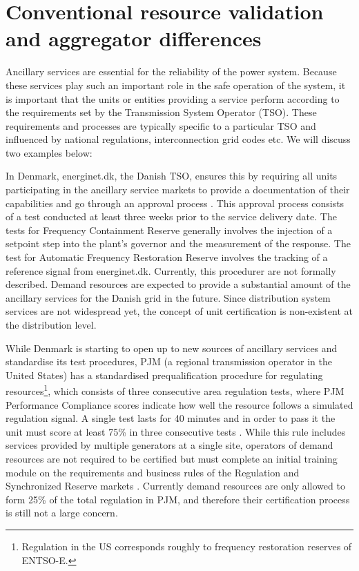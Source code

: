 \section{Conventional resource validation and aggregator differences}
Ancillary services are essential for the reliability of the power system. Because these services play such an important role in the safe operation of the system, it is important that the units or entities providing a service perform according to the requirements set by the Transmission System Operator (TSO). These requirements and processes are typically specific to a particular TSO and influenced by national regulations, interconnection grid codes etc. We will discuss two examples below:

In Denmark, energinet.dk, the Danish TSO, ensures this by requiring all units participating in the ancillary service markets to provide a documentation of their capabilities and go through an approval process \cite{energinettender}. This approval process consists of a test conducted at least three weeks prior to the service delivery date. The tests for Frequency Containment Reserve generally involves the injection of a setpoint step into the plant's governor and the measurement of the response. The test for Automatic Frequency Restoration Reserve involves the tracking of a reference signal from energinet.dk. Currently, this procedurer are not formally described.
Demand resources are expected to provide a substantial amount of the ancillary services for the Danish grid in the future. Since distribution system services are not widespread yet, the concept of unit certification is non-existent at the distribution level. 

While Denmark is starting to open up to new sources of ancillary services and standardise its test procedures, PJM (a regional transmission operator in the United States) has a standardised prequalification procedure for regulating resources\footnote{Regulation in the US corresponds roughly to frequency restoration reserves of ENTSO-E.}, which consists of three consecutive area regulation tests, where PJM Performance Compliance scores indicate how well the resource follows a simulated regulation signal. A single test lasts for 40 minutes and in order to pass it the unit must score at least 75\% in three consecutive tests \cite{pjm2015balance}. While this rule includes services provided by multiple generators at a single site, operators of demand resources are not required to be certified but must complete an initial training module on the requirements and business rules of the Regulation and Synchronized Reserve markets \cite{pjm2015certification}. Currently demand resources are only allowed to form 25\% of the total regulation \cite{pjm2015ancillary} in PJM, and therefore their certification process is still not a large concern. 


